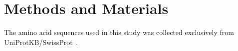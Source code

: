 \section{Methods and Materials}

The amino acid sequences used in this study was collected exclusively from UniProtKB/SwissProt \cite{Magrane:2011fv}. 